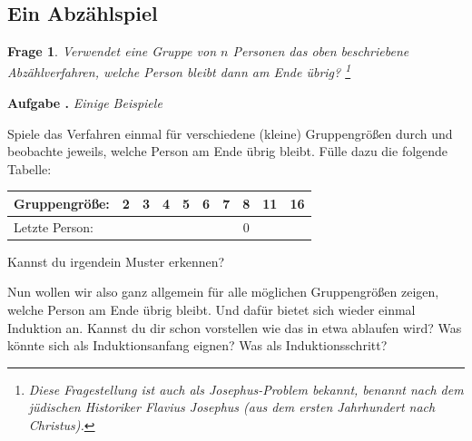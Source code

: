 \documentclass[a4paper,ngerman,12pt]{scrartcl}
\theoremstyle{definition}
\theoremstyle{plain}
\newtheorem{frage}[defn]{Frage}
\theoremstyle{remark}
\newlength{\aufgabenskip}
\newcounter{aufgabennummer}
\newenvironment{aufgabe}[1]{
	\addtocounter{aufgabennummer}{1}
	\textbf{Aufgabe \theaufgabennummer.} \emph{#1} \par
}{\vspace{\aufgabenskip}}
\begin{document}
\subsection{Ein Abzählspiel}



\begin{frage}
	Verwendet eine Gruppe von $n$ Personen das oben beschriebene Abzählverfahren, welche Person bleibt dann am Ende übrig?
	\footnote{Diese Fragestellung ist auch als Josephus-Problem bekannt, benannt nach dem jüdischen Historiker Flavius Josephus (aus dem ersten Jahrhundert nach Christus).}
\end{frage}

\begin{aufgabe}{Einige Beispiele}
	Spiele das Verfahren einmal für verschiedene (kleine) Gruppengrößen durch und beobachte jeweils, welche Person am Ende übrig bleibt. Fülle dazu die folgende Tabelle:
	\begin{center}
		\renewcommand{\arraystretch}{2}\setlength{\tabcolsep}{1em}
		\begin{tabular}{l||c|c|c|c|c|c|c|c|c}
			Gruppengröße:	& 2	& 3 & 4 & 5 & 6 & 7 & 8 & 11 & 16 \\\hline
			Letzte Person:	&   &   &   &   &   &   & 0 &    &    
		\end{tabular}
	\end{center}
	Kannst du irgendein Muster erkennen? 
\end{aufgabe}

Nun wollen wir also ganz allgemein für alle möglichen Gruppengrößen zeigen, welche Person am Ende übrig bleibt. Und dafür bietet sich wieder einmal Induktion an. Kannst du dir schon vorstellen wie das in etwa ablaufen wird? Was könnte sich als Induktionsanfang eignen? Was als Induktionsschritt?




%
%
%
\end{document}
